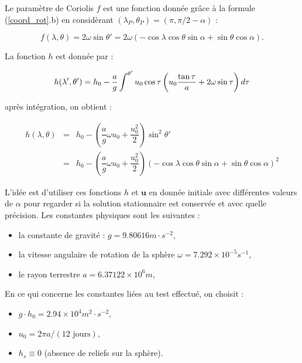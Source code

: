 Le paramètre de Coriolis $f$ est une fonction donnée grâce à la formule (\ref{coord_rot}.b) en considèrant $(\lambda_P, \theta_P) = (\pi, \pi/2 - \alpha)$ :

\begin{equation}
f (\lambda, \theta) = 2 \omega \sin \theta' = 2 \omega \left( - \cos \lambda \cos \theta \sin \alpha + \sin \theta \cos \alpha \right).
\end{equation}

La fonction $h$ est donnée par :

\begin{equation}
h(\lambda', \theta') = h_0 - \dfrac{a}{g} \displaystyle\int^{\theta'} u_0 \cos \tau \left( u_0 \dfrac{\tan \tau}{a} + 2 \omega \sin \tau \right) d \tau
\end{equation}

après intégration, on obtient :

\begin{equation}
\begin{array}{rcl}
h(\lambda, \theta) & = & h_0 - \left( \dfrac{a}{g} \omega u_0 + \dfrac{u_0^2}{2} \right) \sin^2 \theta' \\
                   & = & h_0 - \left( \dfrac{a}{g} \omega u_0 + \dfrac{u_0^2}{2} \right) \left( - \cos \lambda \cos \theta \sin \alpha + \sin \theta \cos \alpha \right)^2
\end{array}
\label{eq: williamson 2 initial height}
\end{equation}

L'idée est d'utiliser ces fonctions $h$ et $\mathbf{u}$ en donnée initiale avec différentes valeurs de $\alpha$ pour regarder si la solution stationnaire est conservée et avec quelle précision.
Les constantes physiques sont les suivantes :
\begin{itemize}
\item la constante de gravité : $g=9.80616 m \cdot s^{-2}$,
\item la vitesse angulaire de rotation de la sphère $\omega=7.292 \times 10^{-5} s^{-1}$,
\item le rayon terrestre $a=6.37122 \times 10^6 m$,
\end{itemize}
En ce qui concerne les constantes liées au test effectué, on choisit :
\begin{itemize}
\item $g \cdot h_0= 2.94 \times 10^4 m^2 \cdot s^{-2}$,
\item $u_0= 2 \pi a / (12 \text{ jours})$,
\item $h_s \equiv 0$ (absence de reliefs sur la sphère).
\end{itemize}

